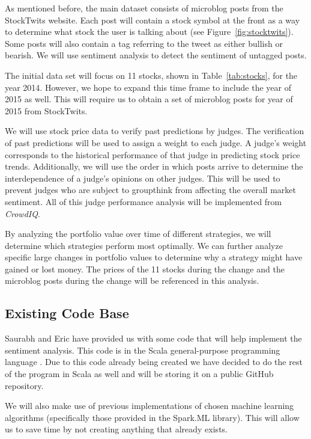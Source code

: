 As mentioned before, the main dataset consists of microblog posts from the StockTwits website.
Each post will contain a stock symbol at the front as a way to determine what stock the user is talking about (see Figure~\ref{fig:stocktwits}).
Some posts will also contain a tag referring to the tweet as either bullish or bearish.
We will use sentiment analysis to detect the sentiment of untagged posts.

The initial data set will focus on 11 stocks, shown in Table~\ref{tab:stocks}, for the year 2014.
However, we hope to expand this time frame to include the year of 2015 as well.
This will require us to obtain a set of microblog posts for year of 2015 from StockTwits.

We will use stock price data to verify past predictions by judges.
The verification of past predictions will be used to assign a weight to each judge.
A judge's weight corresponds to the historical performance of that judge in predicting stock price trends.
Additionally, we will use the order in which posts arrive to determine the interdependence of a judge's opinions on other judges.
This will be used to prevent judges who are subject to groupthink from affecting the overall market sentiment.
All of this judge performance analysis will be implemented from \textit{CrowdIQ}.

By analyzing the portfolio value over time of different strategies, we will determine which strategies perform most optimally.
We can further analyze specific large changes in portfolio values to determine why a strategy might have gained or lost money.
The prices of the 11 stocks during the change and the microblog posts during the change will be referenced in this analysis.

\subsection{Existing Code Base}

Saurabh and Eric have provided us with some code that will help implement the sentiment analysis.
This code is in the Scala general-purpose programming language \cite{scala}.
Due to this code already being created we have decided to do the rest of the program in Scala as well and will be storing it on a public GitHub repository.

We will also make use of previous implementations of chosen machine learning algorithms (specifically those provided in the Spark.ML library).
This will allow us to save time by not creating anything that already exists.

